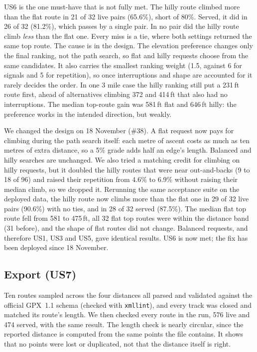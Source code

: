 US6 is the one must-have that is not fully met. The hilly route climbed more
than the flat route in 21 of 32 live pairs (65.6\%), short of 80\%. Served, it
did in 26 of 32 (81.2\%), which passes by a single pair. In no pair did the
hilly route climb \emph{less} than the flat one. Every miss is a tie, where
both settings returned the same top route. The cause is in the design. The
elevation preference changes only the final ranking, not the path search, so
flat and hilly requests choose from the same candidates. It also carries the
smallest ranking weight (1.5, against 6 for signals and 5 for repetition), so
once interruptions and shape are accounted for it rarely decides the order.
In one 3 mile case the hilly ranking still put a 231\,ft route first, ahead
of alternatives climbing 372 and 414\,ft that also had no interruptions. The
median top-route gain was 581\,ft flat and 646\,ft hilly: the preference
works in the intended direction, but weakly.

We changed the design on 18 November (\#38). A flat request now pays for
climbing during the path search itself: each metre of ascent costs as much as
ten metres of extra distance, so a 5\% grade adds half an edge's length.
Balanced and hilly searches are unchanged. We also tried a matching credit for
climbing on hilly requests, but it doubled the hilly routes that were near
out-and-backs (9 to 18 of 96) and raised their repetition from 4.6\% to 6.9\%
without raising their median climb, so we dropped it. Rerunning the same
acceptance suite on the deployed data, the hilly route now climbs more than
the flat one in 29 of 32 live pairs (90.6\%) with no ties, and in 28 of 32
served (87.5\%). The median flat top route fell from 581 to 475\,ft, all 32
flat top routes were within the distance band (31 before), and the shape of
flat routes did not change. Balanced requests, and therefore US1, US3 and US5,
gave identical results. US6 is now met; the fix has been deployed since
18 November.

\subsection{Export (US7)}
Ten routes sampled across the four distances all parsed and validated against
the official GPX~1.1 schema (checked with \texttt{xmllint}), and every track
was closed and matched its route's length. We then checked every route in the
run, 576 live and 474 served, with the same result. The length check is
nearly circular, since the reported distance is computed from the same points
the file contains. It shows that no points were lost or duplicated, not that
the distance itself is right. 


